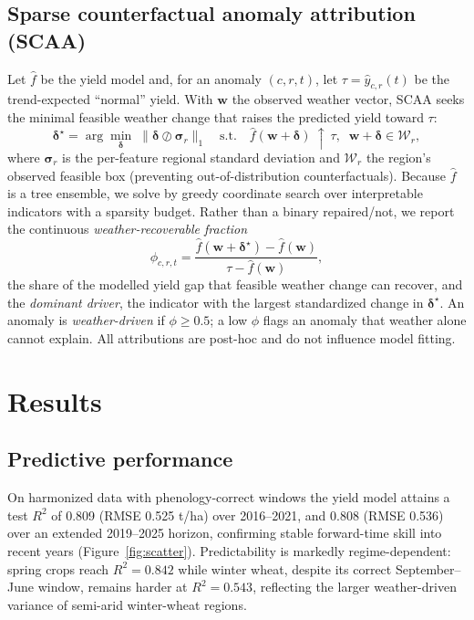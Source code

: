 \documentclass[11pt]{article}
\begin{document}
\subsection{Sparse counterfactual anomaly attribution (SCAA)}
\label{sec:scaa}
Let $\hat f$ be the yield model and, for an anomaly $(c,r,t)$, let
$\tau=\hat y_{c,r}(t)$ be the trend-expected ``normal'' yield. With $\mathbf w$ the
observed weather vector, SCAA seeks the minimal feasible weather change that raises the
predicted yield toward $\tau$:
\begin{equation}
\bm\delta^\star=\arg\min_{\bm\delta}\;\|\bm\delta\oslash\bm\sigma_r\|_1
\quad\text{s.t.}\quad \hat f(\mathbf w+\bm\delta)\ \uparrow\ \tau,\;\;
\mathbf w+\bm\delta\in\mathcal W_r,
\end{equation}
where $\bm\sigma_r$ is the per-feature regional standard deviation and $\mathcal W_r$
the region's observed feasible box (preventing out-of-distribution counterfactuals).
Because $\hat f$ is a tree ensemble, we solve by greedy coordinate search over
interpretable indicators with a sparsity budget. Rather than a binary repaired/not, we
report the continuous \emph{weather-recoverable fraction}
\begin{equation}
\phi_{c,r,t}=\frac{\hat f(\mathbf w+\bm\delta^\star)-\hat f(\mathbf w)}{\tau-\hat f(\mathbf w)},
\end{equation}
the share of the modelled yield gap that feasible weather change can recover, and the
\emph{dominant driver}, the indicator with the largest standardized change in
$\bm\delta^\star$. An anomaly is \emph{weather-driven} if $\phi\ge0.5$; a low $\phi$
flags an anomaly that weather alone cannot explain. All attributions are post-hoc and do
not influence model fitting.

\section{Results}
\label{sec:results}

\subsection{Predictive performance}
\label{sec:perf}
On harmonized data with phenology-correct windows the yield model attains a test $R^2$
of 0.809 (RMSE 0.525 t/ha) over 2016--2021, and 0.808 (RMSE 0.536) over an extended
2019--2025 horizon, confirming stable forward-time skill into recent years
(Figure~\ref{fig:scatter}). Predictability is markedly regime-dependent: spring crops
reach $R^2=0.842$ while winter wheat, despite its correct September--June window,
remains harder at $R^2=0.543$, reflecting the larger weather-driven variance of
semi-arid winter-wheat regions.
\end{document}
